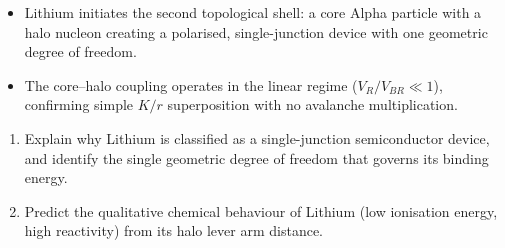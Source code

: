 \begin{summarybox}
\begin{itemize}
    \item Lithium initiates the second topological shell: a core Alpha particle with a halo nucleon creating a polarised, single-junction device with one geometric degree of freedom.
    \item The core--halo coupling operates in the linear regime ($V_R/V_{BR} \ll 1$), confirming simple $K/r$ superposition with no avalanche multiplication.
\end{itemize}
\end{summarybox}

\begin{exercisebox}
\begin{enumerate}
    \item Explain why Lithium is classified as a single-junction semiconductor device, and identify the single geometric degree of freedom that governs its binding energy.
    \item Predict the qualitative chemical behaviour of Lithium (low ionisation energy, high reactivity) from its halo lever arm distance.
\end{enumerate}
\end{exercisebox}

